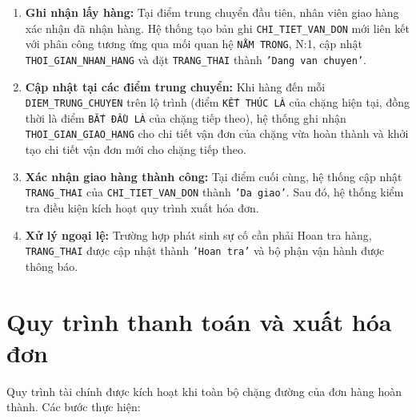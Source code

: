 \documentclass[11pt]{report}
\begin{document}
\begin{enumerate}
    \item \textbf{Ghi nhận lấy hàng:} Tại điểm trung chuyển đầu tiên, nhân viên giao hàng xác nhận đã nhận hàng. Hệ thống tạo bản ghi \texttt{CHI\_TIET\_VAN\_DON} mới liên kết với phân công tương ứng qua mối quan hệ \texttt{NẰM TRONG}, N:1, cập nhật \texttt{THOI\_GIAN\_NHAN\_HANG} và đặt \texttt{TRANG\_THAI} thành \texttt{'Dang van chuyen'}.

    \item \textbf{Cập nhật tại các điểm trung chuyển:} Khi hàng đến mỗi \texttt{DIEM\_TRUNG\_CHUYEN} trên lộ trình (điểm \texttt{KẾT THÚC LÀ} của chặng hiện tại, đồng thời là điểm \texttt{BẮT ĐẦU LÀ} của chặng tiếp theo), hệ thống ghi nhận \texttt{THOI\_GIAN\_GIAO\_HANG} cho chi tiết vận đơn của chặng vừa hoàn thành và khởi tạo chi tiết vận đơn mới cho chặng tiếp theo.

    \item \textbf{Xác nhận giao hàng thành công:} Tại điểm cuối cùng, hệ thống cập nhật \texttt{TRANG\_THAI} của \texttt{CHI\_TIET\_VAN\_DON} thành \texttt{'Da giao'}. Sau đó, hệ thống kiểm tra điều kiện kích hoạt quy trình xuất hóa đơn.
    
    \item \textbf{Xử lý ngoại lệ:} Trường hợp phát sinh sự cố cần phải Hoan tra hàng, \texttt{TRANG\_THAI} được cập nhật thành \texttt{'Hoan tra'} và bộ phận vận hành được thông báo.
\end{enumerate}


\section{Quy trình thanh toán và xuất hóa đơn}
\label{sec:qt_thanhtoan}

Quy trình tài chính được kích hoạt khi toàn bộ chặng đường của đơn hàng hoàn thành. Các bước thực hiện:
\end{document}
